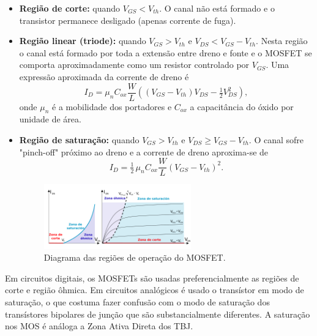 \documentclass[12pt]{article}
\begin{document}
                \begin{itemize}
                    
                    \item \textbf{Região de corte:} quando $V_{GS}<V_{th}$. O canal não está formado e o transistor permanece desligado (apenas corrente de fuga).

                    \item \textbf{Região linear (triode):} quando $V_{GS}>V_{th}$ e $V_{DS}<V_{GS}-V_{th}$. Nesta região o canal está formado por toda a extensão entre dreno e fonte e o MOSFET se comporta aproximadamente como um resistor controlado por $V_{GS}$. Uma expressão aproximada da corrente de dreno é
                    \[
                    I_D = \mu_n C_{ox} \frac{W}{L}\left((V_{GS}-V_{th})V_{DS}-\tfrac{1}{2}V_{DS}^2\right),
                    \]
                    onde $\mu_n$ é a mobilidade dos portadores e $C_{ox}$ a capacitância do óxido por unidade de área.

                    \item \textbf{Região de saturação:} quando $V_{GS}>V_{th}$ e $V_{DS}\ge V_{GS}-V_{th}$. O canal sofre "pinch-off" próximo ao dreno e a corrente de dreno aproxima-se de
                    \[
                    I_D = \tfrac{1}{2}\,\mu_n C_{ox} \frac{W}{L}(V_{GS}-V_{th})^2.
                    \]

                        \begin{figure}[htpb!]
                        
                            \centering
                            \includegraphics[width=0.6\textwidth]{./images/MOSFET_enhancement-mode_n-channel.svg.png}
                            \caption{Diagrama das regiões de operação do MOSFET.}

                        \end{figure}

                \end{itemize}

            Em circuitos digitais, os MOSFETs são usadas preferencialmente as regiões de corte e região ôhmica. Em circuitos analógicos é usado o transístor em modo de saturação, o que costuma fazer confusão com o modo de saturação dos transístores bipolares de junção que são substancialmente diferentes. A saturação nos MOS é análoga a Zona Ativa Direta dos TBJ.
                
\end{document}
